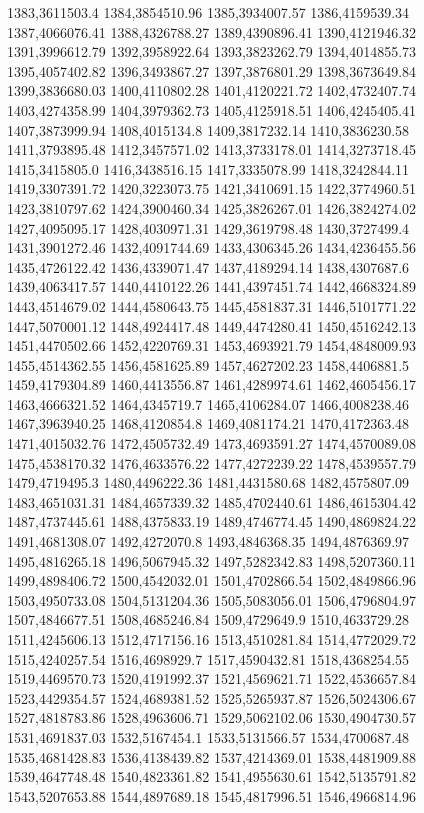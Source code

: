 1383,3611503.4
1384,3854510.96
1385,3934007.57
1386,4159539.34
1387,4066076.41
1388,4326788.27
1389,4390896.41
1390,4121946.32
1391,3996612.79
1392,3958922.64
1393,3823262.79
1394,4014855.73
1395,4057402.82
1396,3493867.27
1397,3876801.29
1398,3673649.84
1399,3836680.03
1400,4110802.28
1401,4120221.72
1402,4732407.74
1403,4274358.99
1404,3979362.73
1405,4125918.51
1406,4245405.41
1407,3873999.94
1408,4015134.8
1409,3817232.14
1410,3836230.58
1411,3793895.48
1412,3457571.02
1413,3733178.01
1414,3273718.45
1415,3415805.0
1416,3438516.15
1417,3335078.99
1418,3242844.11
1419,3307391.72
1420,3223073.75
1421,3410691.15
1422,3774960.51
1423,3810797.62
1424,3900460.34
1425,3826267.01
1426,3824274.02
1427,4095095.17
1428,4030971.31
1429,3619798.48
1430,3727499.4
1431,3901272.46
1432,4091744.69
1433,4306345.26
1434,4236455.56
1435,4726122.42
1436,4339071.47
1437,4189294.14
1438,4307687.6
1439,4063417.57
1440,4410122.26
1441,4397451.74
1442,4668324.89
1443,4514679.02
1444,4580643.75
1445,4581837.31
1446,5101771.22
1447,5070001.12
1448,4924417.48
1449,4474280.41
1450,4516242.13
1451,4470502.66
1452,4220769.31
1453,4693921.79
1454,4848009.93
1455,4514362.55
1456,4581625.89
1457,4627202.23
1458,4406881.5
1459,4179304.89
1460,4413556.87
1461,4289974.61
1462,4605456.17
1463,4666321.52
1464,4345719.7
1465,4106284.07
1466,4008238.46
1467,3963940.25
1468,4120854.8
1469,4081174.21
1470,4172363.48
1471,4015032.76
1472,4505732.49
1473,4693591.27
1474,4570089.08
1475,4538170.32
1476,4633576.22
1477,4272239.22
1478,4539557.79
1479,4719495.3
1480,4496222.36
1481,4431580.68
1482,4575807.09
1483,4651031.31
1484,4657339.32
1485,4702440.61
1486,4615304.42
1487,4737445.61
1488,4375833.19
1489,4746774.45
1490,4869824.22
1491,4681308.07
1492,4272070.8
1493,4846368.35
1494,4876369.97
1495,4816265.18
1496,5067945.32
1497,5282342.83
1498,5207360.11
1499,4898406.72
1500,4542032.01
1501,4702866.54
1502,4849866.96
1503,4950733.08
1504,5131204.36
1505,5083056.01
1506,4796804.97
1507,4846677.51
1508,4685246.84
1509,4729649.9
1510,4633729.28
1511,4245606.13
1512,4717156.16
1513,4510281.84
1514,4772029.72
1515,4240257.54
1516,4698929.7
1517,4590432.81
1518,4368254.55
1519,4469570.73
1520,4191992.37
1521,4569621.71
1522,4536657.84
1523,4429354.57
1524,4689381.52
1525,5265937.87
1526,5024306.67
1527,4818783.86
1528,4963606.71
1529,5062102.06
1530,4904730.57
1531,4691837.03
1532,5167454.1
1533,5131566.57
1534,4700687.48
1535,4681428.83
1536,4138439.82
1537,4214369.01
1538,4481909.88
1539,4647748.48
1540,4823361.82
1541,4955630.61
1542,5135791.82
1543,5207653.88
1544,4897689.18
1545,4817996.51
1546,4966814.96
